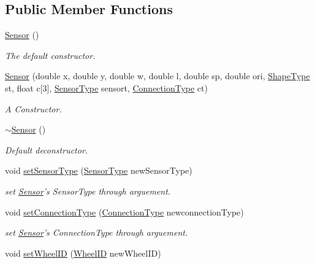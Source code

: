 \subsection*{Public Member Functions}
\begin{DoxyCompactItemize}
\item 
\hyperlink{classSensor_a342d6d11ef572c8cba92cb76fb1a294b}{Sensor} ()
\begin{DoxyCompactList}\small\item\em The default constructor. \end{DoxyCompactList}\item 
\hyperlink{classSensor_a44bc63370538b343bcf1cf124f995a12}{Sensor} (double x, double y, double w, double l, double sp, double ori, \hyperlink{Shape_8h_a5a4538eeab397888d88a4eefcc5a1345}{Shape\-Type} st, float c\mbox{[}3\mbox{]}, \hyperlink{Sensor_8h_a213c434cb928c4ca22513e2302632435}{Sensor\-Type} sensort, \hyperlink{Sensor_8h_aa1f0e2efd52935fd01bfece0fbead81f}{Connection\-Type} ct)
\begin{DoxyCompactList}\small\item\em A Constructor. \end{DoxyCompactList}\item 
\hyperlink{classSensor_aee8c70e7ef05ce65e7ee33686b5d7db2}{$\sim$\-Sensor} ()
\begin{DoxyCompactList}\small\item\em Default deconstructor. \end{DoxyCompactList}\item 
void \hyperlink{classSensor_ae41bd5116afb0cc747540ddb365fa7c9}{set\-Sensor\-Type} (\hyperlink{Sensor_8h_a213c434cb928c4ca22513e2302632435}{Sensor\-Type} new\-Sensor\-Type)
\begin{DoxyCompactList}\small\item\em set \hyperlink{classSensor}{Sensor}'s Sensor\-Type through arguement. \end{DoxyCompactList}\item 
void \hyperlink{classSensor_ace4a85e58bd2c50f862b3b92346ab662}{set\-Connection\-Type} (\hyperlink{Sensor_8h_aa1f0e2efd52935fd01bfece0fbead81f}{Connection\-Type} newconnection\-Type)
\begin{DoxyCompactList}\small\item\em set \hyperlink{classSensor}{Sensor}'s Connection\-Type through arguement. \end{DoxyCompactList}\item 
void \hyperlink{classSensor_a3ec4aeec58a0568b4db754378f3f3875}{set\-Wheel\-I\-D} (\hyperlink{Sensor_8h_a231524b302f9d7e6dd216fa89296f844}{Wheel\-I\-D} new\-Wheel\-I\-D)

\end{DoxyCompactItemize}
